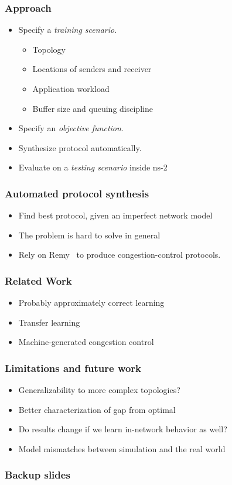 \documentclass[svgnames]{beamer}
\begin{document}
\begin{Large}
\begin{frame}
\frametitle{Approach}
\begin{itemize}
\item Specify a \textit{training scenario}.
\begin{itemize}
\item Topology
\item Locations of senders and receiver
\item Application workload
\item Buffer size and queuing discipline 
\end{itemize}
\item Specify an \textit{objective function}.
\item Synthesize protocol automatically.
\item Evaluate on a \textit{testing scenario} inside ns-2
\end{itemize}
\end{frame}

\begin{frame}
\frametitle{Automated protocol synthesis}
\begin{itemize}
\item Find best protocol, given an imperfect network model
\item The problem is hard to solve in general
\item Rely on Remy~\cite{remy} to produce congestion-control protocols.
\end{itemize}
\end{frame}












\begin{frame}
\frametitle{Related Work}
\begin{itemize}
\item Probably approximately correct learning
\item Transfer learning
\item Machine-generated congestion control
\end{itemize}
\end{frame}

\begin{frame}
\frametitle{Limitations and future work}
\begin{itemize}
\item Generalizability to more complex topologies?
\item Better characterization of gap from optimal
\item Do results change if we learn in-network behavior as well?
\item Model mismatches between simulation and the real world
\end{itemize}
\end{frame}
\end{Large}

\begin{frame}
\frametitle{Backup slides}
\end{frame}

\end{document}
